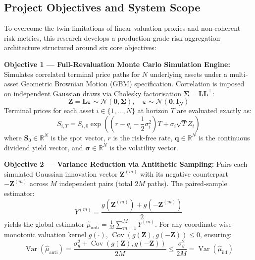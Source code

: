 \documentclass{article}
\theoremstyle{plain}
\theoremstyle{definition}
\theoremstyle{remark}
\DeclareMathOperator{\Var}{Var}
\DeclareMathOperator{\Cov}{Cov}
\begin{document}
\subsection{Project Objectives and System Scope}
To overcome the twin limitations of linear valuation proxies and non-coherent risk metrics, this research develops a production-grade risk aggregation architecture structured around six core objectives:

\textbf{Objective 1 — Full-Revaluation Monte Carlo Simulation Engine:} Simulates correlated terminal price paths for $N$ underlying assets under a multi-asset Geometric Brownian Motion (GBM) specification. Correlation is imposed on independent Gaussian draws via Cholesky factorisation $\mathbf{\Sigma} = \mathbf{L}\mathbf{L}^\top$:
\begin{equation}
    \mathbf{Z} = \mathbf{L}\boldsymbol{\varepsilon} \sim \mathcal{N}(\mathbf{0}, \mathbf{\Sigma}), \quad \boldsymbol{\varepsilon} \sim \mathcal{N}(\mathbf{0}, \mathbf{I}_N)
\end{equation}
Terminal prices for each asset $i \in \{1, \dots, N\}$ at horizon $T$ are evaluated exactly as:
\begin{equation}
    S_{i, T} = S_{i, 0} \exp\left( \left(r - q_i - \frac{1}{2}\sigma_i^2\right)T + \sigma_i \sqrt{T} Z_i \right)
\end{equation}
where $\mathbf{S}_0 \in \mathbb{R}^N$ is the spot vector, $r$ is the risk-free rate, $\mathbf{q} \in \mathbb{R}^N$ is the continuous dividend yield vector, and $\boldsymbol{\sigma} \in \mathbb{R}^N$ is the volatility vector.

\textbf{Objective 2 — Variance Reduction via Antithetic Sampling:} Pairs each simulated Gaussian innovation vector $\mathbf{Z}^{(m)}$ with its negative counterpart $-\mathbf{Z}^{(m)}$ across $M$ independent pairs (total $2M$ paths). The paired-sample estimator:
\begin{equation}
    Y^{(m)} = \frac{g(\mathbf{Z}^{(m)}) + g(-\mathbf{Z}^{(m)})}{2}
\end{equation}
yields the global estimator $\hat{\mu}_{\text{anti}} = \frac{1}{M}\sum_{m=1}^M Y^{(m)}$. For any coordinate-wise monotonic valuation kernel $g(\cdot)$, $\Cov(g(\mathbf{Z}), g(-\mathbf{Z})) \le 0$, ensuring:
\begin{equation}
    \Var(\hat{\mu}_{\text{anti}}) = \frac{\sigma_g^2 + \Cov(g(\mathbf{Z}), g(-\mathbf{Z}))}{2M} \le \frac{\sigma_g^2}{2M} = \Var(\hat{\mu}_{\text{iid}})
\end{equation}
\end{document}
